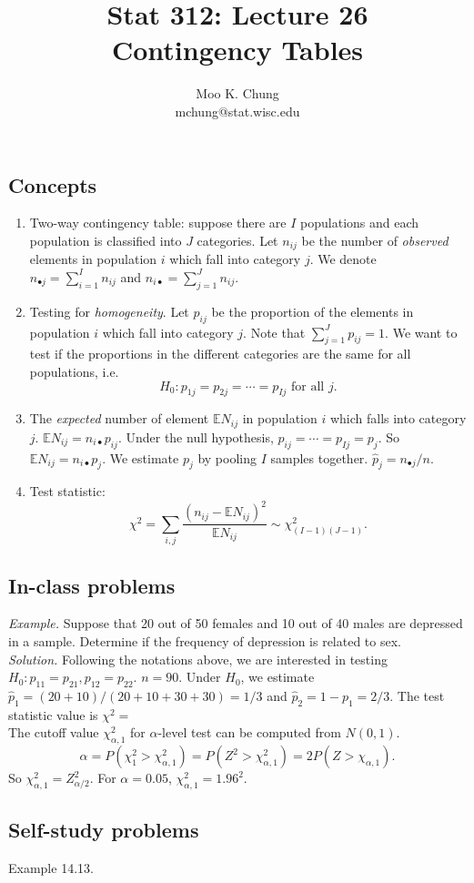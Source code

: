 \documentclass[12pt,twocolumn]{article} %
\begin{document}
\title{Stat 312: Lecture 26\\
Contingency Tables}
\author{Moo K. Chung\\
mchung@stat.wisc.edu}
\maketitle \thispagestyle{empty}
\subsection*{Concepts}
\begin{enumerate}
\item Two-way contingency table: suppose there are $I$ populations
and each population is classified into $J$ categories. Let
$n_{ij}$ be the number of {\em observed} elements in population
$i$ which fall into category $j$. We denote $n_{\bullet j} =
\sum_{i=1}^I n_{ij}$ and $n_{i \bullet} = \sum_{j=1}^J n_{ij}$.


\item Testing for {\em homogeneity}. Let $p_{ij}$ be the
proportion of the elements in population $i$ which fall into
category $j$. Note that $\sum_{j=1}^J p_{ij}=1$. We want to test
if the proportions in the different categories are the same for
all populations, i.e.
$$H_0: p_{1j} = p_{2j} = \cdots = p_{Ij} \mbox{ for all } j.$$

\item The {\em expected} number of element $\mathbb{E} N_{ij}$ in
population $i$ which falls into category $j$. $\mathbb{E}
N_{ij}=n_{i\bullet}p_{ij}$. Under the null hypothesis,
$p_{ij}=\cdots=p_{Ij}=p_j$. So $\mathbb{E}N_{ij}=n_{i
\bullet}p_j$. We estimate $p_j$ by pooling $I$ samples together.
$\hat p_j = n_{\bullet j}/n$.

\item Test statistic:
$$\chi^2 = \sum_{i,j}
\frac{(n_{ij}-\mathbb{E}N_{ij})^2}{\mathbb{E}N_{ij}} \sim
\chi^2_{(I-1)(J-1)}.$$
\end{enumerate}

\subsection*{In-class problems}
{\em Example.} Suppose that 20 out of 50 females and 10 out of 40
males are depressed in a sample. Determine if the frequency of
depression is related to sex.\\
 {\em Solution.} Following the notations above, we are interested
 in testing $H_0: p_{11}=p_{21}, p_{12}=p_{22}$. $n=90$. Under $H_0$, we
 estimate $\hat p_1=(20+10)/(20+10+30+30) = 1/3$ and $\hat p_2=1-p_1=2/3$.
The test statistic
 value is $\chi^2 = $\\
The cutoff value $\chi^2_{\alpha,1}$ for $\alpha$-level test can
be computed from $N(0,1)$.
$$\alpha=P(\chi^2_1 > \chi^2_{\alpha,1}) = P(Z^2>
\chi^2_{\alpha,1})=2P(Z > \chi_{\alpha,1}).$$ So
$\chi^2_{\alpha,1}=Z^2_{\alpha/2}$. For $\alpha=0.05$,
$\chi^2_{\alpha,1}=1.96^2$.
\subsection*{Self-study problems}
Example 14.13.
\end{document}
